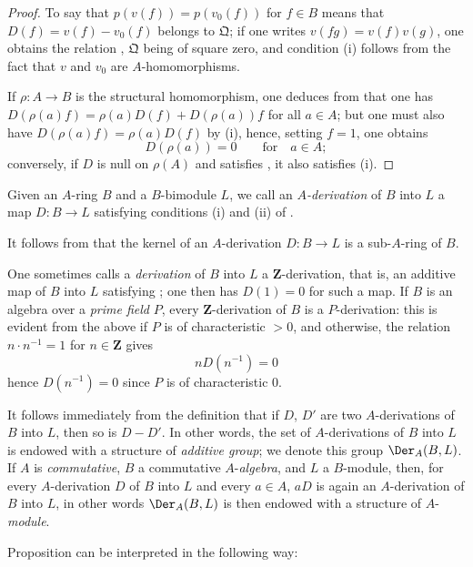 \begin{proof}
To say that $p(v(f))=p(v_0(f))$ for $f\in B$ means that $D(f)=v(f)-v_0(f)$ belongs to $\mathfrak{Q}$; if one writes $v(fg)=v(f)v(g)$, one obtains the relation , $\mathfrak{Q}$ being of square zero, and condition (i) follows from the fact that $v$ and $v_0$ are $A$-homomorphisms.

If $\rho:A\to B$ is the structural homomorphism, one deduces from  that one has $D(\rho(a)f)=\rho(a)D(f)+D(\rho(a))f$ for all $a\in A$; but one must also have $D(\rho(a)f)=\rho(a)D(f)$ by (i), hence, setting $f=1$, one obtains
\[
  D(\rho(a)) = 0 \qquad\text{for}\quad a\in A;
\]
conversely, if $D$ is null on $\rho(A)$ and satisfies , it also satisfies (i).
\end{proof}

\begin{definition}[20.1.2]
\label{0.20.1.2}
Given an $A$-ring $B$ and a $B$-bimodule $L$, we call an \emph{$A$-derivation} of $B$ into $L$ a map $D:B\to L$ satisfying conditions (i) and (ii) of .
\end{definition}

It follows from  that the kernel of an $A$-derivation $D:B\to L$ is a sub-$A$-ring of $B$.

One sometimes calls a \emph{derivation} of $B$ into $L$ a $\mathbf{Z}$-derivation, that is, an additive map of $B$ into $L$ satisfying ; one then has $D(1)=0$ for such a map.
If $B$ is an algebra over a \emph{prime field} $P$, every $\mathbf{Z}$-derivation of $B$ is a $P$-derivation: this is evident from the above if $P$ is of characteristic $>0$, and otherwise, the relation $n\cdot n^{-1}=1$ for $n\in\mathbf{Z}$ gives
\[
  nD(n^{-1}) = 0
\]
hence $D(n^{-1})=0$ since $P$ is of characteristic $0$.

It follows immediately from the definition  that if $D$, $D'$ are two $A$-derivations of $B$ into $L$, then so is $D-D'$.
In other words, the set of $A$-derivations of $B$ into $L$ is endowed with a structure of \emph{additive group}; we denote this group $\Der_A(B,L)$.
If $A$ is \emph{commutative}, $B$ a commutative $A$-\emph{algebra}, and $L$ a $B$-module, then, for every $A$-derivation $D$ of $B$ into $L$ and every $a\in A$, $aD$ is again an $A$-derivation of $B$ into $L$, in other words $\Der_A(B,L)$ is then endowed with a structure of $A$-\emph{module}.

Proposition  can be interpreted in the following way:

